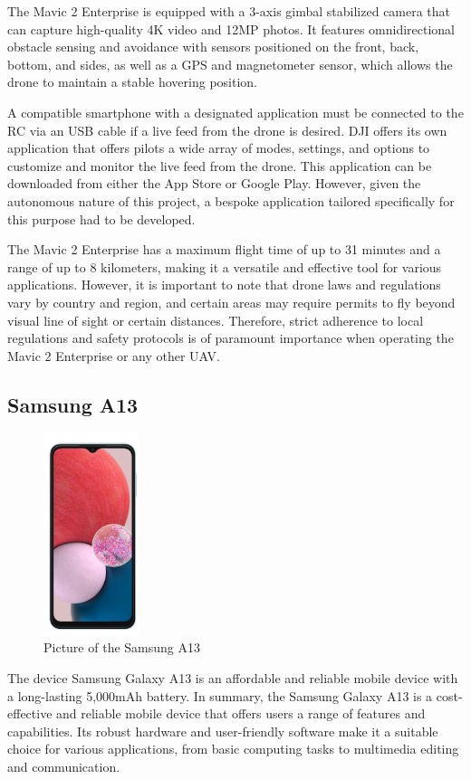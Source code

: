 The Mavic 2 Enterprise is equipped with a 3-axis gimbal stabilized camera that can capture high-quality 4K video and 12MP photos. It features omnidirectional obstacle sensing and avoidance with sensors positioned on the front, back, bottom, and sides, as well as a GPS and magnetometer sensor, which allows the drone to maintain a stable hovering position.

A compatible smartphone with a designated application must be connected to the RC via an USB cable if a live feed from the drone is desired. DJI offers its own application that offers pilots a wide array of modes, settings, and options to customize and monitor the live feed from the drone. This application can be downloaded from either the App Store or Google Play. However, given the autonomous nature of this project, a bespoke application tailored specifically for this purpose had to be developed.

The Mavic 2 Enterprise has a maximum flight time of up to 31 minutes and a range of up to 8 kilometers, making it a versatile and effective tool for various applications. However, it is important to note that drone laws and regulations vary by country and region, and certain areas may require permits to fly beyond visual line of sight or certain distances. Therefore, strict adherence to local regulations and safety protocols is of paramount importance when operating the Mavic 2 Enterprise or any other UAV.



\subsection{Samsung A13} \label{Samsung}
\begin{figure}[h!]
\centering
 \includegraphics[width=0.25\textwidth,angle =90]{figure/Samsung_A13.png}
\caption{Picture of the Samsung A13}
\end{figure}
The device Samsung Galaxy A13 is an affordable and reliable mobile device with a long-lasting 5,000mAh battery.
In summary, the Samsung Galaxy A13 is a cost-effective and reliable mobile device that offers users a range of features and capabilities. Its robust hardware and user-friendly software make it a suitable choice for various applications, from basic computing tasks to multimedia editing and communication.



